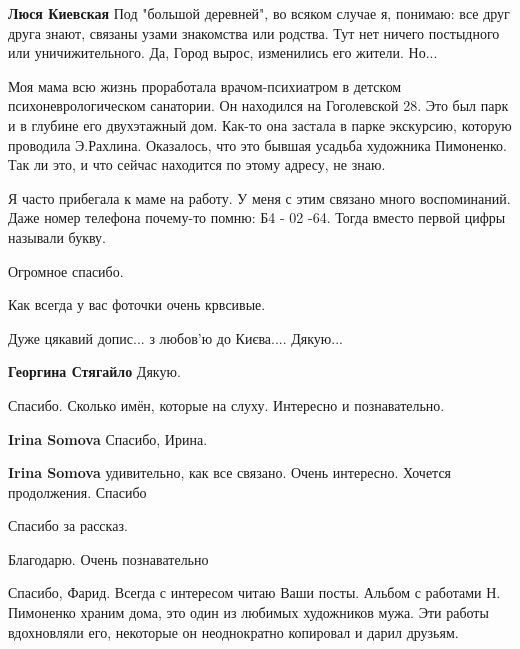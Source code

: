 \begin{itemize}
\begin{itemize} %
\textbf{Люся Киевская}
Под "большой деревней", во всяком случае я, понимаю: все друг друга знают, связаны узами знакомства или родства.
Тут нет ничего постыдного или уничижительного.
Да, Город вырос, изменились его жители. Но...
\end{itemize} %


Моя мама всю жизнь проработала врачом-психиатром в детском психоневрологическом
санатории. Он находился на Гоголевской 28. Это был парк и в глубине его
двухэтажный дом. Как-то она застала в парке экскурсию, которую проводила
Э.Рахлина. Оказалось, что это бывшая усадьба художника Пимоненко. Так ли это, и
что сейчас находится по этому адресу, не знаю.

Я часто прибегала к маме на работу. У меня с этим связано много воспоминаний.
Даже номер телефона почему-то помню: Б4 - 02 -64. Тогда вместо первой цифры
называли букву.

\begin{itemize} %
Огромное спасибо.

Как всегда у вас фоточки очень крвсивые.
\end{itemize} %

Дуже цякавий допис... з любов'ю до Києва.... Дякую...

\begin{itemize} %
\textbf{Георгина Стягайло}
Дякую.
\end{itemize} %

Спасибо. Сколько имён, которые на слуху. Интересно и познавательно.

\begin{itemize} %
\textbf{Irina Somova}
Спасибо, Ирина.

\textbf{Irina Somova} удивительно, как все связано. Очень интересно. Хочется продолжения. Спасибо

\end{itemize} %

Спасибо за рассказ.

Благодарю. Очень познавательно


Спасибо, Фарид. Всегда с интересом читаю Ваши посты. Альбом с работами Н.
Пимоненко храним дома, это один из любимых художников мужа. Эти работы
вдохновляли его, некоторые он неоднократно копировал и дарил друзьям.


\end{itemize}
